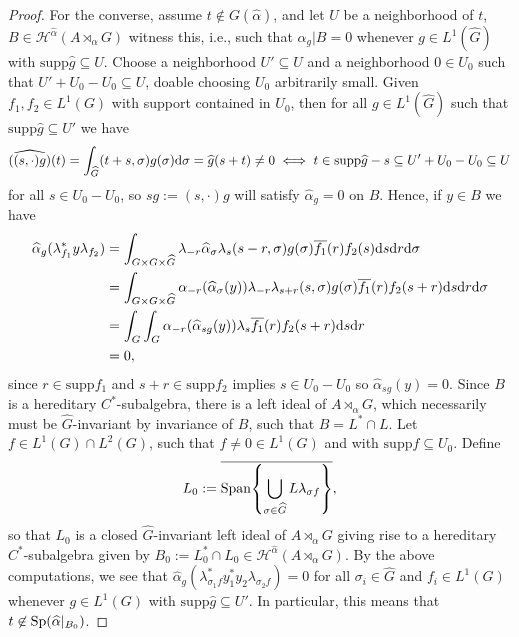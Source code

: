 \begin{proof}
	For the converse, assume $t \not \in G(\hat \alpha)$, and let $U$ be a neighborhood of $t$, $B \in \mathscr{H}^{\hat \alpha}(A \rtimes_\alpha G)$  witness this, i.e., such that $\hat \alpha _g | B = 0$ whenever $g \in L^1(\hat G)$ with $\mathrm{supp} \hat g \subseteq U $. Choose a neighborhood $U' \subseteq U$ and a neighborhood $0 \in U_0$ such that $U' + U_0-U_0 \subseteq U$, doable choosing $U_0$ arbitrarily small. Given $f_1,f_2 \in L^1(G)$ with support contained in $U_0$, then for all $g \in L^1(\hat G)$ such that $\mathrm{supp} \hat g \subseteq U'$ we have
\begin{align*}
	\widehat{((s,\cdot)g)}(t) = \int_{\widehat{G}} (t+s, \sigma) g(\sigma) \mathrm{d} \sigma = \widehat{g}(s+t)  \neq 0 \iff t \in \mathrm{supp} \widehat{g} - s \subseteq U'+U_0-U_0 \subseteq U
\end{align*}
for all $s \in U_0-U_0$, so $sg := (s, \cdot) g$ will satisfy $\hat \alpha_g = 0$ on $B$. Hence, if $y \in B$ we have
\begin{align*}
	\widehat{\alpha}_g(\lambda_{f_1}^* y \lambda_{f_2}) &=  \int_{G \times G \times \widehat{G}} \lambda_{-r} \widehat{\alpha}_\sigma \lambda_s (s-r,\sigma) g(\sigma) \overline{f_1}(r) f_2(s) \mathrm{d} s \mathrm{d} r \mathrm{d} \sigma\\
	&=  \int_{G \times G \times \widehat{G}} \alpha_{-r}(\widehat{\alpha}_\sigma(y)) \lambda_{-r} \lambda_{s+r}(s,\sigma) g(\sigma) \overline{f_1}(r) f_2(s+r) \mathrm{d} s \mathrm{d} r \mathrm{d} \sigma\\
	&= \int_{G} \int_G \alpha_{-r}(\widehat{\alpha}_{sg}(y)) \lambda_s \overline{f_1}(r) f_2(s+r) \mathrm{d} s \mathrm{d} r\\
	&= 0,
\end{align*}
since $r \in \mathrm{supp} f_1$ and $s+r \in \mathrm{supp} f_2$ implies $s \in U_0-U_0$ so $\hat \alpha_{sg}(y) = 0$. Since $B$ is a hereditary $C^*$-subalgebra, there is a left ideal of $A \rtimes_\alpha G$, which necessarily must be $\hat G$-invariant by invariance of $B$, such that $B = L^* \cap L$. Let $f \in L^1(G) \cap L^2(G)$, such that $f \neq 0 \in L^1(G)$ and with $\mathrm{supp} f \subseteq U_0$. Define
\begin{align*}
	L_0 :=	\overline{\mathrm{Span} {\left\{\bigcup_{\sigma \in \widehat{G}} L \lambda_{\sigma f}\right\}}},
\end{align*}
so that $L_0$ is a closed $\hat G$-invariant left ideal of $A \rtimes_\alpha G$ giving rise to a hereditary $C^*$-subalgebra given by $B_0:= L_0^* \cap L_0 \in \mathscr H^{\hat \alpha}(A \rtimes_{\alpha}G)$. By the above computations, we see that $\hat \alpha_g(\lambda_{\sigma_1 f}^* y_1^* y_2 \lambda_{\sigma_2 f}) = 0$ for all $\sigma_i \in \hat G$ and $f_i \in L^1(G)$ whenever $g \in L^1(G)$ with $\mathrm{supp} \hat g \subseteq U'$. In particular, this means that $t \not\in \mathrm{Sp}(\widehat{\alpha}|_{B_0})$.


\end{proof}
